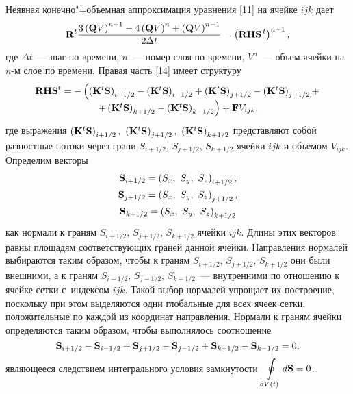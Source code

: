 Неявная конечно"=объемная аппроксимация уравнения \eqref{11} на ячейке ${ijk}$ дает
\begin{equation}
  \label{14} 
  {\bf{R}}^t \frac{{3\left( {{\bf{Q}}V} \right)^{n + 1} - 4\left( {{\bf{Q}}V} \right)^n  + \left( {{\bf{Q}}V}
  \right)^{n - 1} }}{{2\Delta t}} = \left( {{\bf{RHS}}^{\,t} } \right)^{n + 1},
\end{equation}
где $\Delta t$~--- шаг по времени, $n$~--- номер слоя по времени, $V^n$~--- объем ячейки на $n$-м слое по 
времени. Правая часть \eqref{14} имеет структуру
\begin{equation*}
  \begin{array}{c}
  {\bf{RHS}}^t  =  - \left( {\left( {{\bf{K}}^t {\bf{S}}} \right)_{i + 1/2}  - \left( {{\bf{K}}^t {\bf{S}}} 
  \right)_{i - 1/2}  + \left( {{\bf{K}}^t {\bf{S}}} \right)_{j + 1/2}  - \left( {{\bf{K}}^t {\bf{S}}} 
  \right)_{j - 1/2}  + } \right. \\
  \left. { + \left( {{\bf{K}}^t {\bf{S}}} \right)_{k + 1/2}  - \left( {{\bf{K}}^t {\bf{S}}} \right)_{k - 1/2}}
  \right) + {\bf{F}}V_{ijk}, \\
  \end{array}
\end{equation*}
где выражения $ \left( {{\bf{K}}^t {\bf{S}}} \right)_{i + 1/2},\ \left( {{\bf{K}}^t {\bf{S}}} 
\right)_{j + 1/2} ,\ \left({{\bf{K}}^t {\bf{S}}} \right)_{k + 1/2}$ представляют собой
разностные потоки через грани $S_{i + 1/2},\, S_{j + 1/2},\, S_{k + 1/2}$ ячейки $ijk$ и объемом 
$V_{ijk} $. Определим векторы
\begin{gather}
  {\bf{S}}_{i + 1/2}  = \left( {{{S}}_x ,\ {{S}}_y ,\ {{S}}_z } \right)_{i + 1/2} ,\notag \\
  {\bf{S}}_{j + 1/2}  = \left( {{{S}}_x ,\ {{S}}_y ,\ {{S}}_z } \right)_{j + 1/2} ,\notag \\
  {\bf{S}}_{k + 1/2}  = \left( {{{S}}_x ,\ {{S}}_y ,\ {{S}}_z } \right)_{k + 1/2}
  \label{15}
\end{gather}
как нормали к граням $S_{i + 1/2},\, S_{j + 1/2},\, S_{k + 1/2}$ ячейки $ijk$. Длины этих векторов 
равны площадям соответствующих граней данной ячейки. Направления нормалей выбираются таким образом, чтобы к 
граням $S_{i + 1/2},\, S_{j + 1/2},\, S_{k + 1/2}$ они были внешними, а к граням $S_{i - 1/2},\,
S_{j - 1/2},\, S_{k - 1/2}$~--- внутренними по отношению к ячейке сетки с~индексом $ijk$. Такой выбор 
нормалей упрощает их построение, поскольку при этом выделяются одни глобальные для всех ячеек сетки, 
положительные по каждой из координат направления. Нормали к граням ячейки определяются таким образом, чтобы
выполнялось соотношение
\begin{equation}
  \label{16} 
  {\bf{S}}_{i + 1/2}  - {\bf{S}}_{i - 1/2}  + {\bf{S}}_{j + 1/2}  - {\bf{S}}_{j - 1/2}  + {\bf{S}}_{k + 1/2}
  - {\bf{S}}_{k - 1/2}  = 0,
\end{equation}
являющееся следствием интегрального условия замкнутости $\displaystyle\oint\limits_{\partial V(t)} 
{d{\bf{S}}} = 0$.


